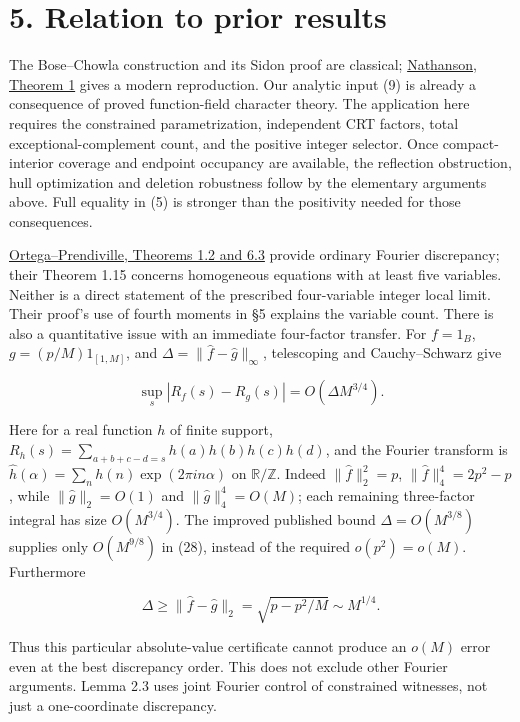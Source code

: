 \documentclass[11pt,a4paper]{article}
\begin{document}
\section{5. Relation to prior results}\label{relation-to-prior-results}

The Bose--Chowla construction and its Sidon proof are classical; \href{https://arxiv.org/pdf/2104.12711v3}{Nathanson, Theorem 1} gives a modern reproduction. Our analytic input (9) is already a consequence of proved function-field character theory. The application here requires the constrained parametrization, independent CRT factors, total exceptional-complement count, and the positive integer selector. Once compact-interior coverage and endpoint occupancy are available, the reflection obstruction, hull optimization and deletion robustness follow by the elementary arguments above. Full equality in (5) is stronger than the positivity needed for those consequences.

\href{https://www.numdam.org/item/10.5802/jtnb.1239.pdf}{Ortega--Prendiville, Theorems 1.2 and 6.3} provide ordinary Fourier discrepancy; their Theorem 1.15 concerns homogeneous equations with at least five variables. Neither is a direct statement of the prescribed four-variable integer local limit. Their proof's use of fourth moments in §5 explains the variable count. There is also a quantitative issue with an immediate four-factor transfer. For \(f=1_B\), \(g=(p/M)1_{[1,M]}\), and \(\Delta=\|\widehat f-\widehat g\|_\infty\), telescoping and Cauchy--Schwarz give

\[\sup_s|R_f(s)-R_g(s)|=O(\Delta M^{3/4}).
\tag{28}\]

Here for a real function \(h\) of finite support, \(R_h(s)=\sum_{a+b+c-d=s}h(a)h(b)h(c)h(d)\), and the Fourier transform is \(\widehat h(\alpha)=\sum_n h(n)\exp(2\pi i n\alpha)\) on \(\mathbb R/\mathbb Z\). Indeed \(\|\widehat f\|_2^2=p\), \(\|\widehat f\|_4^4=2p^2-p\), while \(\|\widehat g\|_2=O(1)\) and \(\|\widehat g\|_4^4=O(M)\); each remaining three-factor integral has size \(O(M^{3/4})\). The improved published bound \(\Delta=O(M^{3/8})\) supplies only \(O(M^{9/8})\) in (28), instead of the required \(o(p^2)=o(M)\). Furthermore

\[\Delta\ge\|\widehat f-\widehat g\|_2
       =\sqrt{p-p^2/M}\sim M^{1/4}.\]

Thus this particular absolute-value certificate cannot produce an \(o(M)\) error even at the best discrepancy order. This does not exclude other Fourier arguments. Lemma 2.3 uses joint Fourier control of constrained witnesses, not just a one-coordinate discrepancy.
\end{document}

